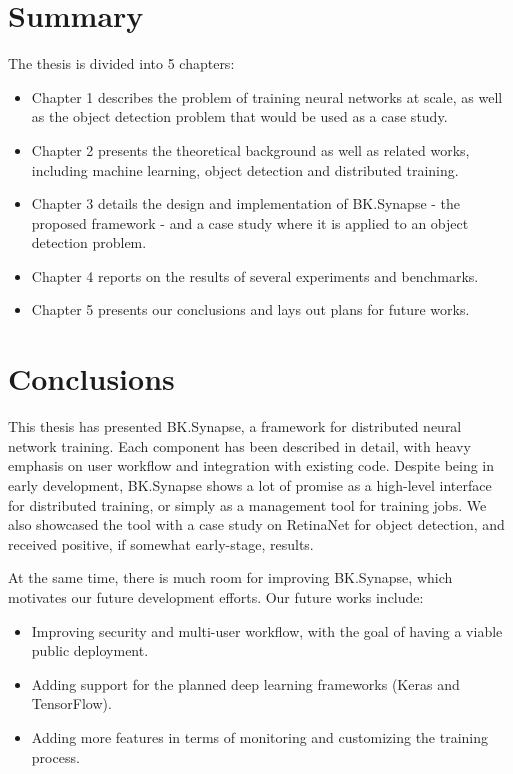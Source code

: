 \documentclass[a4paper, 12pt, oneside]{report}
\begin{document}
\chapter*{Summary}
The thesis is divided into 5 chapters:
\begin{itemize}
    \item Chapter 1 describes the problem of training neural networks at scale, as well as the object detection problem that would be used as a case study.
    \item Chapter 2 presents the theoretical background as well as related works, including machine learning, object detection and distributed training.
    \item Chapter 3 details the design and implementation of BK.Synapse - the proposed framework - and a case study where it is applied to an object detection problem.
    \item Chapter 4 reports on the results of several experiments and benchmarks.
    \item Chapter 5 presents our conclusions and lays out plans for future works.
\end{itemize}

\pagebreak
{}
\tableofcontents
\pagebreak
{}
\setcounter{page}{1}
\listoffigures
\listoftables

\printglossary[type=\acronymtype,style=long, title=List of Abbreviations]
\printglossary
\pagebreak



\pagebreak



\chapter{Conclusions}
This thesis has presented BK.Synapse, a framework for distributed neural network training. Each component has been described in detail, with heavy emphasis on user workflow and integration with existing code. Despite being in early development, BK.Synapse shows a lot of promise as a high-level interface for distributed training, or simply as a management tool for training jobs. We also showcased the tool with a case study on RetinaNet for object detection, and received positive, if somewhat early-stage, results.

At the same time, there is much room for improving BK.Synapse, which motivates our future development efforts. Our future works include:
\begin{itemize}
    \item Improving security and multi-user workflow, with the goal of having a viable public deployment.
    \item Adding support for the planned deep learning frameworks (Keras and TensorFlow).
    \item Adding more features in terms of monitoring and customizing the training process.
\end{itemize}

\pagebreak



\end{document}
